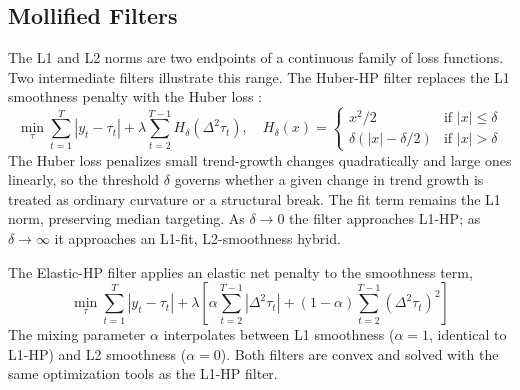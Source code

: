 \documentclass[10pt]{article}
\begin{document}
\subsection{Mollified Filters}
\label{app:mollified}

The L1 and L2 norms are two endpoints of a continuous family of loss functions. Two intermediate filters illustrate this range. The Huber-HP filter replaces the L1 smoothness penalty with the Huber loss \citep{huber1964}:
\begin{equation}
\label{eq:huber_hp}
\min_\tau \sum_{t=1}^T |y_t - \tau_t| + \lambda \sum_{t=2}^{T-1} H_\delta(\Delta^2 \tau_t), \quad H_\delta(x) = \begin{cases} x^2/2 & \text{if } |x| \leq \delta \\ \delta(|x| - \delta/2) & \text{if } |x| > \delta \end{cases}
\end{equation}
The Huber loss penalizes small trend-growth changes quadratically and large ones linearly, so the threshold $\delta$ governs whether a given change in trend growth is treated as ordinary curvature or a structural break. The fit term remains the L1 norm, preserving median targeting. As $\delta \to 0$ the filter approaches L1-HP; as $\delta \to \infty$ it approaches an L1-fit, L2-smoothness hybrid.

The Elastic-HP filter applies an elastic net penalty \citep{zou_hastie2005} to the smoothness term,
\begin{equation}
\label{eq:elastic_hp}
\min_\tau \sum_{t=1}^T |y_t - \tau_t| + \lambda \left[\alpha \sum_{t=2}^{T-1} |\Delta^2 \tau_t| + (1 - \alpha) \sum_{t=2}^{T-1} (\Delta^2 \tau_t)^2 \right]
\end{equation}
The mixing parameter $\alpha$ interpolates between L1 smoothness ($\alpha = 1$, identical to L1-HP) and L2 smoothness ($\alpha = 0$). Both filters are convex and solved with the same optimization tools as the L1-HP filter.
\end{document}
